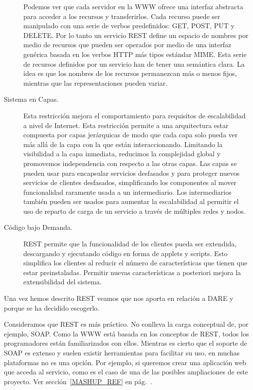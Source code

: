 \begin{description}
  Podemos ver que cada servidor en la WWW ofrece una interfaz
  abstracta para acceder a los recursos y transferirlos. Cada recurso
  puede ser manipulado con una serie de verbos predefinidos: GET,
  POST, PUT y DELETE. Por lo tanto un servicio REST define un espacio
  de nombres por medio de recursos que pueden ser operados por medio
  de una interfaz genérica basada en los verbos HTTP más tipos
  estándar MIME. Esta serie de recursos definidos por un servicio han
  de tener una semántica clara. La idea es que los nombres de los
  recursos permanezcan más o menos fijos, mientras que las
  representaciones pueden variar.

\item[Sistema en Capas.] Esta restricción mejora el comportamiento para
  requisitos de escalabilidad a nivel de Internet. Esta restricción
  permite a una arquitectura estar compuesta por capas jerárquicas de
  modo que cada capa solo pueda ver más allá de la capa con la que
  están interaccionando. Limitando la visibilidad a la capa inmediata,
  reducimos la complejidad global y promovemos independencia con
  respecto a las otras capas. Las capas se pueden usar para encapsular
  servicios desfasados y para proteger nuevos servicios de clientes
  desfasados, simplificando los componentes al mover funcionalidad
  raramente usada a un intermediario. Los intermediarios también
  pueden ser usados para aumentar la escalabilidad al permitir el uso
  de reparto de carga de un servicio a través de múltiples redes y
  nodos.

\item[Código bajo Demanda.] REST permite que la funcionalidad de los
  clientes pueda ser extendida, descargando y ejecutando código en
  forma de applets y scripts. Esto simplifica los clientes al reducir
  el número de características que tienen que estar
  preinstaladas. Permitir nuevas características a posteriori mejora
  la extensibilidad del sistema.
\end{description}

Una vez hemos descrito REST veamos que nos aporta en relación a DARE y
porque se ha decidido escogerlo.

Consideramos que REST es más práctico. No conlleva la carga conceptual
de, por ejemplo, SOAP\cite{SOAP}. Como la WWW está basada en los
conceptos de REST, todos los programadores están familiarizados con
ellos. Mientras es cierto que el soporte de SOAP es extenso y suelen
existir herramientas para facilitar su uso, en muchas plataformas no
es una opción. Por ejemplo, si queremos crear una aplicación web que
acceda al servicio, como es el caso de una de las posibles
ampliaciones de este proyecto. Ver sección~\ref{MASHUP_REF} en
pág.~\pageref{MASHUP_REF}.

